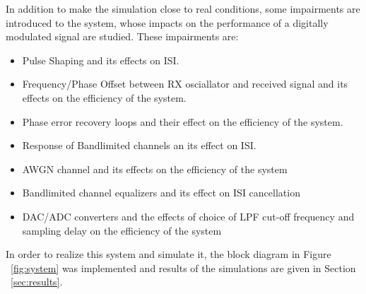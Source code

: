 \documentclass[]{article}
\begin{document}
In addition to make the simulation close to real conditions, some impairments are introduced to the system, whose impacts on the performance of a digitally modulated signal are studied. These impairments are:
\begin{itemize}
\item Pulse Shaping and its effects on ISI.
\item Frequency/Phase Offset between RX osciallator and received signal and its effects on the efficiency of the system.
\item Phase error recovery loops and their effect on the efficiency of the system.
\item Response of Bandlimited channels an its effect on ISI.
\item AWGN channel and its effects on the efficiency of the system
\item Bandlimited channel equalizers and its effect on ISI cancellation
\item DAC/ADC converters and the effects of choice of LPF cut-off frequency and sampling delay on the efficiency of the system  
\end{itemize}

In order to realize this system and simulate it, the block diagram in Figure ~\ref{fig:system} was implemented and results of the simulations are given in Section ~\ref{sec:results}.
\end{document}
